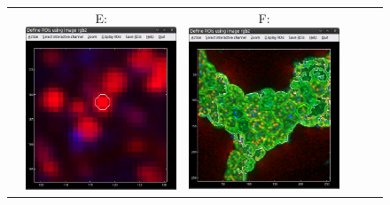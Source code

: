 \begin{figure}[!b]
\begin{tabular}{cccccc}
&
E: \includegraphics[scale=0.23]{figs3/LANS-roi-interactive4}
&
F: \includegraphics[scale=0.23]{figs3/LANS-roi-interactive5}

\end{tabular}
\end{figure}
